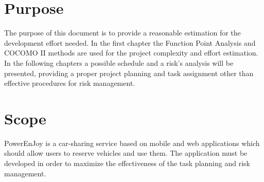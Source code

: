 \section{Purpose}
The purpose of this document is to provide a reasonable estimation for the development effort needed.
In the first chapter the Function Point Analysis and COCOMO II methods are used for the project complexity and effort estimation. In the following chapters a possible schedule and a risk's analysis will be presented, providing a proper project planning and task assignment other than effective procedures for risk management.

\section{Scope}
PowerEnJoy is a car-sharing service based on mobile and web applications which should allow users to reserve vehicles and use them.
The application must be developed in order to maximize the effectiveness of the task planning and risk management.